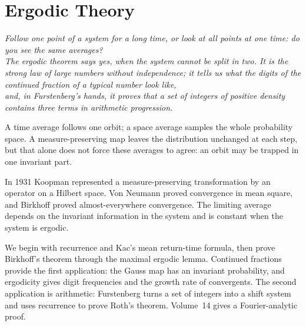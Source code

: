 \chapter{Ergodic Theory}\label{ch:ergodic}
\begin{center}\itshape
Follow one point of a system for a long time, or look at all points at one time: do you see the same averages?\\
The ergodic theorem says yes, when the system cannot be split in two.
It is the strong law of large numbers without independence; it tells us what the digits of the continued fraction of a typical number look like,\\
and, in Furstenberg's hands, it proves that a set of integers of positive density contains three terms in arithmetic progression.
\end{center}

A time average follows one orbit; a space average samples the whole probability space. A measure-preserving map leaves the distribution unchanged at each step, but that alone does not force these averages to agree: an orbit may be trapped in one invariant part.

In 1931 Koopman represented a measure-preserving transformation by an operator on a Hilbert space. Von Neumann proved convergence in mean square, and Birkhoff proved almost-everywhere convergence. The limiting average depends on the invariant information in the system and is constant when the system is ergodic.

We begin with recurrence and Kac's mean return-time formula, then prove Birkhoff's theorem through the maximal ergodic lemma. Continued fractions provide the first application: the Gauss map has an invariant probability, and ergodicity gives digit frequencies and the growth rate of convergents. The second application is arithmetic: Furstenberg turns a set of integers into a shift system and uses recurrence to prove Roth's theorem. Volume~14 gives a Fourier-analytic proof.


